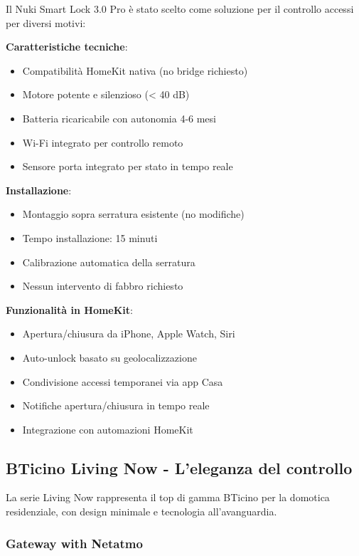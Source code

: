 Il Nuki Smart Lock 3.0 Pro è stato scelto come soluzione per il controllo accessi per diversi motivi:

\textbf{Caratteristiche tecniche}:
\begin{itemize}
    \item Compatibilità HomeKit nativa (no bridge richiesto)
    \item Motore potente e silenzioso (< 40 dB)
    \item Batteria ricaricabile con autonomia 4-6 mesi
    \item Wi-Fi integrato per controllo remoto
    \item Sensore porta integrato per stato in tempo reale
\end{itemize}

\textbf{Installazione}:
\begin{itemize}
    \item Montaggio sopra serratura esistente (no modifiche)
    \item Tempo installazione: 15 minuti
    \item Calibrazione automatica della serratura
    \item Nessun intervento di fabbro richiesto
\end{itemize}

\textbf{Funzionalità in HomeKit}:
\begin{itemize}
    \item Apertura/chiusura da iPhone, Apple Watch, Siri
    \item Auto-unlock basato su geolocalizzazione
    \item Condivisione accessi temporanei via app Casa
    \item Notifiche apertura/chiusura in tempo reale
    \item Integrazione con automazioni HomeKit
\end{itemize}

\subsection{BTicino Living Now - L'eleganza del controllo}

La serie Living Now rappresenta il top di gamma BTicino per la domotica residenziale, con design minimale e tecnologia all'avanguardia.

\subsubsection{Gateway with Netatmo}

